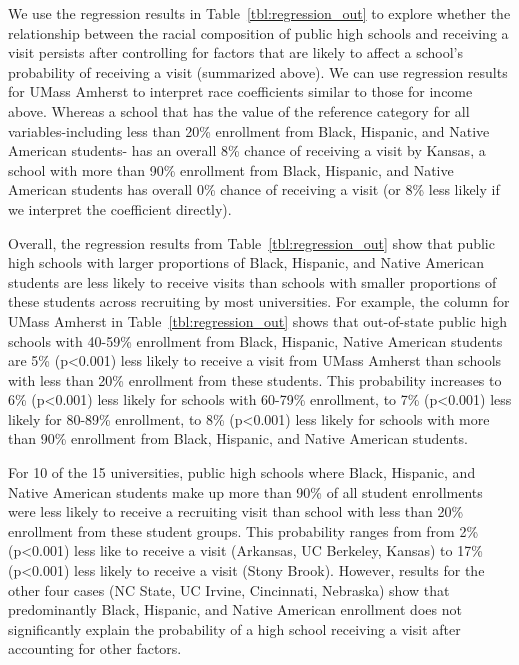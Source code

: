 \documentclass[twoside]{article}
\begin{document}
We use the regression results in Table~\ref{tbl:regression_out} to explore whether the relationship between the racial composition of public high schools and receiving a visit persists after controlling for factors that are likely to affect a school's probability of receiving a visit (summarized above). We can use regression results for UMass Amherst to interpret race coefficients similar to those for income above. Whereas a school that has the value of the reference category for all variables-including less than 20\% enrollment from Black, Hispanic, and Native American students- has an overall 8\% chance of receiving a visit by Kansas, a school with more than 90\% enrollment from Black, Hispanic, and Native American students has overall 0\% chance of receiving a visit (or 8\% less likely if we interpret the coefficient directly).

Overall, the regression results from Table~\ref{tbl:regression_out} show that public high schools with larger proportions of Black, Hispanic, and Native American students are less likely to receive visits than schools with smaller proportions of these students across recruiting by most universities. For example, the column for UMass Amherst in Table~\ref{tbl:regression_out} shows that out-of-state public high schools with 40-59\% enrollment from Black, Hispanic, Native American students are 5\% (p<0.001) less likely to receive a visit from UMass Amherst than schools with less than 20\% enrollment from these students. This probability increases to 6\% (p<0.001) less likely for schools with 60-79\% enrollment, to 7\% (p<0.001) less likely for 80-89\% enrollment, to 8\% (p<0.001) less likely for schools with more than 90\% enrollment from Black, Hispanic, and Native American students.

For 10 of the 15 universities, public high schools where Black, Hispanic, and Native American students make up more than 90\% of all student enrollments were less likely to receive a recruiting visit than school with less than 20\% enrollment from these student groups. This probability ranges from from 2\% (p<0.001) less like to receive a visit (Arkansas, UC Berkeley, Kansas)  to 17\% (p<0.001) less likely to receive a visit (Stony Brook). However, results for the other four cases (NC State, UC Irvine, Cincinnati, Nebraska) show that predominantly Black, Hispanic, and Native American enrollment does not significantly explain the probability of a high school receiving a visit after accounting for other factors.
\end{document}
